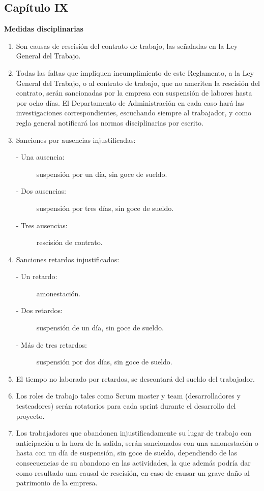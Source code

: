 \documentclass[11pt,letterpaper]{report}
\begin{document}
\subsection{Capítulo IX}
\begin{center}
{\bf Medidas disciplinarias}
\end{center}
\begin{enumerate}
\item Son causas de rescisión del contrato de trabajo, las señaladas en la Ley General del Trabajo.
\item Todas las faltas que impliquen incumplimiento de este Reglamento, a la Ley General del Trabajo, o al contrato de trabajo, que no ameriten la rescisión del contrato, serán sancionadas por la empresa con suspensión de labores hasta por ocho días.
El Departamento de Administración en cada caso hará las investigaciones correspondientes, escuchando siempre al trabajador, y como regla general notificará las normas disciplinarias por escrito.
\item Sanciones por ausencias injustificadas:
\begin{description}
\item[- Una ausencia:] suspensión por un día, sin goce de sueldo.
\item[- Dos ausencias:] suspensión por tres días, sin goce de sueldo.
\item[- Tres ausencias:] rescisión de contrato.
\end{description}
\item Sanciones retardos injustificados:
\begin{description}
\item[- Un retardo:] amonestación.
\item[- Dos retardos:] suspensión de un día, sin goce de sueldo.
\item[- Más de tres retardos:] suspensión por dos días, sin goce de sueldo.
\end{description}
\item El tiempo no laborado por retardos, se descontará del sueldo del trabajador.
\item Los roles de trabajo tales como Scrum master y team (desarrolladores y testeadores) serán rotatorios para cada sprint durante el desarrollo del proyecto.
\item Los trabajadores que abandonen injustificadamente su lugar de trabajo con anticipación a la hora de la salida, serán sancionados con una amonestación o hasta con un día de suspensión, sin goce de sueldo, dependiendo de las consecuencias de su abandono en las actividades, la que además podría dar como resultado una causal de rescisión, en caso de causar un grave daño al patrimonio de la empresa.

\end{enumerate}
\end{document}
